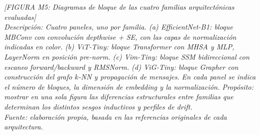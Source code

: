 \begin{table}[H]
\centering
\caption{Especificaciones de los siete modelos evaluados.}
\label{tab:models}
\end{table}

\begin{center}
\textit{[FIGURA M5: Diagramas de bloque de las cuatro familias arquitectónicas evaluadas]}\\
\textit{Descripción: Cuatro paneles, uno por familia. (a) EfficientNet-B1: bloque MBConv con}
\textit{convolución depthwise + SE, con las capas de normalización indicadas en color.}
\textit{(b) ViT-Tiny: bloque Transformer con MHSA y MLP, LayerNorm en posición pre-norm.}
\textit{(c) Vim-Tiny: bloque SSM bidireccional con escaneo forward/backward y RMSNorm.}
\textit{(d) ViG-Tiny: bloque Grapher con construcción del grafo $k$-NN y propagación de mensajes.}
\textit{En cada panel se indica el número de bloques, la dimensión de embedding y la normalización.}
\textit{Propósito: mostrar en una sola figura las diferencias estructurales entre familias que}
\textit{determinan los distintos sesgos inductivos y perfiles de drift.}\\
\textit{Fuente: elaboración propia, basada en las referencias originales de cada arquitectura.}
\end{center}

